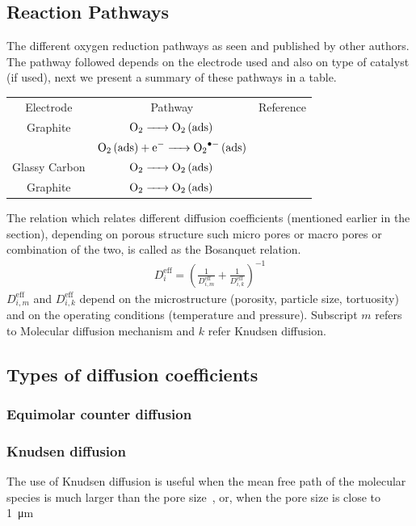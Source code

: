 \documentclass[12pt]{book}
\begin{document}
\subsection{Reaction Pathways}
The different oxygen reduction pathways as seen and published by other authors. The pathway followed depends on the electrode used and also on type of catalyst (if used), next we present a summary of these pathways in a table.
\begin{center}
\begin{tabular}{|c|c|c|}
\hline
Electrode & Pathway & Reference\\
Graphite & $\ce{O2 -> O2 (ads)}$ & \\
               & $\ce{O2 (ads) + e^- -> O2^.- (ads)}$ & \\
\hline
Glassy Carbon & $\ce{O2 -> O2 (ads)}$ & \\
Graphite & $\ce{O2 -> O2 (ads)}$ & \\
\hline 
\end{tabular}
\end{center}

The relation which relates different diffusion coefficients (mentioned earlier in the section), depending on porous structure such micro pores or macro pores or combination of the two, is called as the Bosanquet relation.
\begin{align}
D_i^\textrm{eff}=\left(\frac{1}{D_{i,m}^\textrm{eff}}+\frac{1}{D_{i,k}^\textrm{eff}}\right)^{-1}
\end{align}
$D_{i,m}^\textrm{eff}$ and $D_{i,k}^\textrm{eff}$ depend on the microstructure (porosity, particle size, tortuosity) and on the operating conditions (temperature and pressure).
Subscript $m$ refers to Molecular diffusion mechanism and $k$ refer Knudsen diffusion.
\subsection{Types of diffusion coefficients}
\subsubsection{Equimolar counter diffusion}
\subsubsection{Knudsen diffusion}
The use of Knudsen diffusion is useful when the mean free path of the molecular species is much larger than the pore size~\cite{Suwanwarangkul2003}, or, when the pore size is close to \SI{1}{\micro\meter}~\cite{Deseure2005}
\end{document}
